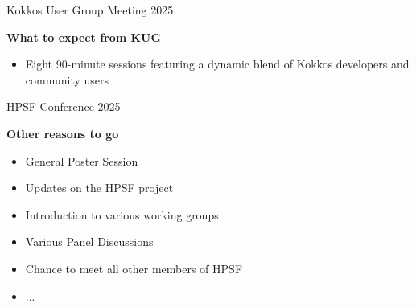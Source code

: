 \begin{frame}[fragile]{Kokkos User Group Meeting 2025}
\begin{center}
\textbf{What to expect from KUG}
\end{center}

\begin{itemize}
  \item{Eight 90-minute sessions featuring a dynamic blend of Kokkos developers and community users}

\end{itemize}
\end{frame}

\begin{frame}[fragile]{HPSF Conference 2025}
\begin{center}
\textbf{Other reasons to go}
\end{center}

\begin{itemize}
  \item{General Poster Session}
  \item{Updates on the HPSF project}
  \item{Introduction to various working groups}
  \item{Various Panel Discussions}
  \item{Chance to meet all other members of HPSF}
  \item{...}
\end{itemize}
\end{frame}


